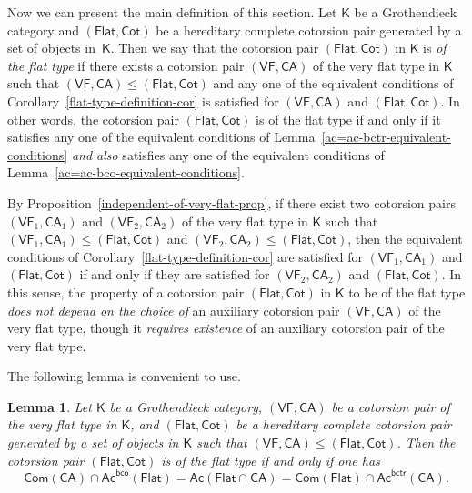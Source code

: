 \documentclass[12pt,a4paper]{amsart}
\newcommand{\+}{\nobreakdash-}
\renewcommand{\:}{\colon}
\newcommand{\sK}{\mathsf K}
\newcommand{\VF}{\mathsf{VF}}
\newcommand{\CA}{\mathsf{CA}}
\newcommand{\Flat}{\mathsf{Flat}}
\newcommand{\Cot}{\mathsf{Cot}}
\newcommand{\Com}{\mathsf{Com}}
\newcommand{\Ac}{\mathsf{Ac}}
\newcommand{\bco}{\mathsf{bco}}
\newcommand{\bctr}{\mathsf{bctr}}
\theoremstyle{plain}
\newtheorem{lem}[thm]{Lemma}
\theoremstyle{definition}
\begin{document}
 Now we can present the main definition of this section.
 Let $\sK$ be a Grothendieck category and $(\Flat,\Cot)$ be a hereditary
complete cotorsion pair generated by a set of objects in~$\sK$.
 Then we say that the cotorsion pair $(\Flat,\Cot)$ in $\sK$ is
\emph{of the flat type} if there exists a cotorsion pair $(\VF,\CA)$
of the very flat type in $\sK$ such that $(\VF,\CA)\le(\Flat,\Cot)$ and
any one of the equivalent conditions of
Corollary~\ref{flat-type-definition-cor} is satisfied for
$(\VF,\CA)$ and $(\Flat,\Cot)$.
 In other words, the cotorsion pair $(\Flat,\Cot)$ is of the flat type
if and only if it satisfies any one of the equivalent conditions of
Lemma~\ref{ac=ac-bctr-equivalent-conditions} \emph{and also}
satisfies any one of the equivalent conditions of
Lemma~\ref{ac=ac-bco-equivalent-conditions}.

 By Proposition~\ref{independent-of-very-flat-prop}, if there exist
two cotorsion pairs $(\VF_1,\CA_1)$ and $(\VF_2,\CA_2)$ of the very
flat type in $\sK$ such that $(\VF_1,\CA_1)\le(\Flat,\Cot)$ and
$(\VF_2,\CA_2)\le(\Flat,\Cot)$, then the equivalent conditions of
Corollary~\ref{flat-type-definition-cor} are satisfied for
$(\VF_1,\CA_1)$ and $(\Flat,\Cot)$ if and only if they are satisfied
for $(\VF_2,\CA_2)$ and $(\Flat,\Cot)$.
 In this sense, the property of a cotorsion pair $(\Flat,\Cot)$ in $\sK$
to be of the flat type \emph{does not depend on the choice of}
an auxiliary cotorsion pair $(\VF,\CA)$ of the very flat type, though
it \emph{requires existence} of an auxiliary cotorsion pair of
the very flat type.

 The following lemma is convenient to use.

\begin{lem} \label{flat-type-convenient-restatement-lemma}
 Let\/ $\sK$ be a Grothendieck category, $(\VF,\CA)$ be a cotorsion pair
of the very flat type in\/ $\sK$, and $(\Flat,\Cot)$ be a hereditary
complete cotorsion pair generated by a set of objects in\/ $\sK$
such that $(\VF,\CA)\le(\Flat,\Cot)$.
 Then the cotorsion pair $(\Flat,\Cot)$ is of the flat type if and only
if one has
$$
 \Com(\CA)\cap\Ac^\bco(\Flat)=\Ac(\Flat\cap\CA)=
 \Com(\Flat)\cap\Ac^\bctr(\CA).
$$
\end{lem}
\end{document}
